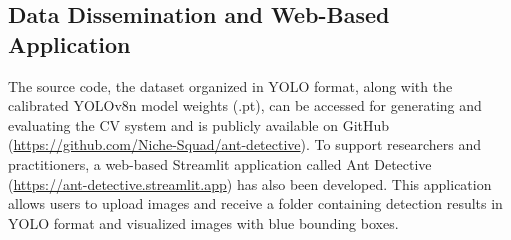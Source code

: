 \subsection{Data Dissemination and Web-Based Application}

The source code, the dataset organized in YOLO format, along with the calibrated YOLOv8n model weights (.pt), can be accessed for generating and evaluating the CV system and is publicly available on GitHub (\url{https://github.com/Niche-Squad/ant-detective}). To support researchers and practitioners, a web-based Streamlit application called Ant Detective (\url{https://ant-detective.streamlit.app}) has also been developed. This application allows users to upload images and receive a folder containing detection results in YOLO format and visualized images with blue bounding boxes.

